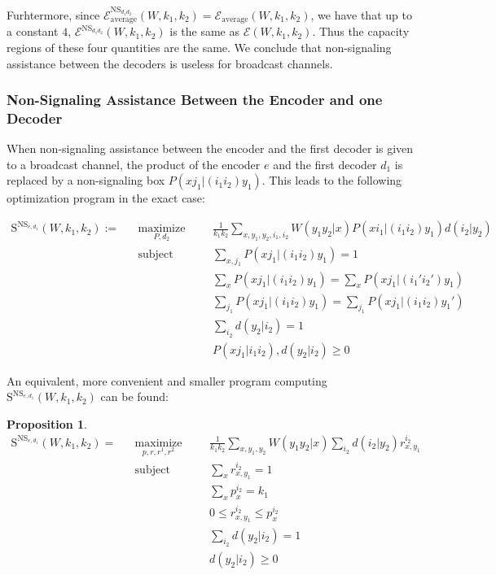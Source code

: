 \documentclass[11pt]{article}
\theoremstyle{definition}
\newtheorem{prop}[theo]{Proposition}
\theoremstyle{remark}
\DeclareMathOperator{\maxi}{\text{maximize}}
\DeclareMathOperator{\st}{\text{subject to}}
\begin{document}
Furhtermore, since $\mathcal{E}_{\text{average}}^{\mathrm{NS}_{d_1d_2}}(W,k_1,k_2)=\mathcal{E}_{\text{average}}(W,k_1,k_2)$, we have that up to a constant $4$, $\mathcal{E}^{\mathrm{NS}_{d_1d_2}}(W,k_1,k_2)$ is the same as $ \mathcal{E}(W,k_1,k_2)$. Thus the capacity regions of these four quantities are the same. We conclude that non-signaling assistance between the decoders is useless for broadcast channels.

\subsubsection{Non-Signaling Assistance Between the Encoder and one Decoder}
When non-signaling assistance between the encoder and the first decoder is given to a broadcast channel, the product of the encoder $e$ and the first decoder $d_1$ is replaced by a non-signaling box $P(xj_1|(i_1i_2)y_1)$. This leads to the following optimization program in the exact case:

\begin{equation}
  \begin{aligned}
    \mathrm{S}^{\mathrm{NS}_{e,d_1}}(W,k_1,k_2) := &&\underset{P,d_2}{\maxi} &&& \frac{1}{k_1k_2}\sum_{x,y_1,y_2,i_1,i_2} W(y_1y_2|x)P(xi_1|(i_1i_2)y_1)d(i_2|y_2)\\
    &&\st &&& \sum_{x,j_1} P(xj_1|(i_1i_2)y_1) = 1\\
    &&&&& \sum_x P(xj_1|(i_1i_2)y_1) = \sum_x P(xj_1|(i_1'i_2')y_1)\\
    &&&&& \sum_{j_1} P(xj_1|(i_1i_2)y_1) = \sum_{j_1} P(xj_1|(i_1i_2)y_1')\\
    &&&&& \sum_{i_2} d(y_2|i_2) = 1\\
    &&&&& P(xj_1|i_1i_2), d(y_2|i_2) \geq 0
  \end{aligned}
\end{equation}

An equivalent, more convenient and smaller program computing $\mathrm{S}^{\mathrm{NS}_{e,d_1}}(W,k_1,k_2)$ can be found:

\begin{prop}
\begin{equation}
  \begin{aligned}
    \mathrm{S}^{\mathrm{NS}_{e,d_1}}(W,k_1,k_2) = &&\underset{p,r,r^1,r^2}{\maxi} &&& \frac{1}{k_1k_2}\sum_{x,y_1,y_2} W(y_1y_2|x)\sum_{i_2}d(i_2|y_2)r^{i_2}_{x,y_1}\\
    &&\st &&& \sum_{x} r^{i_2}_{x,y_1} = 1\\
    &&&&& \sum_{x} p^{i_2}_x = k_1\\
    &&&&& 0 \leq r^{i_2}_{x,y_1} \leq p^{i_2}_x\\
    &&&&& \sum_{i_2} d(y_2|i_2) = 1\\
    &&&&& d(y_2|i_2) \geq 0
  \end{aligned}
\end{equation}
\end{prop}
\end{document}
